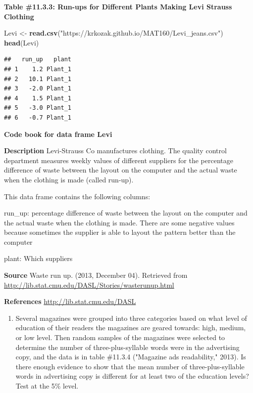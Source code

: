 \documentclass[
]{book}
\newenvironment{Shaded}{\begin{snugshade}}{\end{snugshade}}
\newcommand{\KeywordTok}[1]{\textcolor[rgb]{0.13,0.29,0.53}{\textbf{#1}}}
\newcommand{\NormalTok}[1]{#1}
\newcommand{\StringTok}[1]{\textcolor[rgb]{0.31,0.60,0.02}{#1}}
\providecommand{\tightlist}{%
  \setlength{\itemsep}{0pt}\setlength{\parskip}{0pt}}
\begin{document}
\textbf{Table \#11.3.3: Run-ups for Different Plants Making Levi Strauss Clothing}

\begin{Shaded}
\begin{Highlighting}[]
\NormalTok{Levi <-}\StringTok{ }\KeywordTok{read.csv}\NormalTok{(}\StringTok{"https://krkozak.github.io/MAT160/Levi_jeans.csv"}\NormalTok{)}
\KeywordTok{head}\NormalTok{(Levi)}
\end{Highlighting}
\end{Shaded}

\begin{verbatim}
##   run_up   plant
## 1    1.2 Plant_1
## 2   10.1 Plant_1
## 3   -2.0 Plant_1
## 4    1.5 Plant_1
## 5   -3.0 Plant_1
## 6   -0.7 Plant_1
\end{verbatim}

\textbf{Code book for data frame Levi}

\textbf{Description}
Levi-Strauss Co manufactures clothing. The quality control department measures weekly values of different suppliers for the percentage difference of waste between the layout on the computer and the actual waste when the clothing is made (called run-up).

This data frame contains the following columns:

run\_up: percentage difference of waste between the layout on the computer and the actual waste when the clothing is made. There are some negative values because sometimes the supplier is able to layout the pattern better than the computer

plant: Which suppliers

\textbf{Source}
Waste run up. (2013, December 04). Retrieved from \url{http://lib.stat.cmu.edu/DASL/Stories/wasterunup.html}

\textbf{References}
\url{http://lib.stat.cmu.edu/DASL}

\begin{enumerate}
\def\labelenumi{\arabic{enumi}.}
\setcounter{enumi}{2}
\tightlist
\item
  Several magazines were grouped into three categories based on what level of education of their readers the magazines are geared towards: high, medium, or low level. Then random samples of the magazines were selected to determine the number of three-plus-syllable words were in the advertising copy, and the data is in table \#11.3.4 ("Magazine ads readability," 2013). Is there enough evidence to show that the mean number of three-plus-syllable words in advertising copy is different for at least two of the education levels? Test at the 5\% level.
\end{enumerate}
\end{document}
